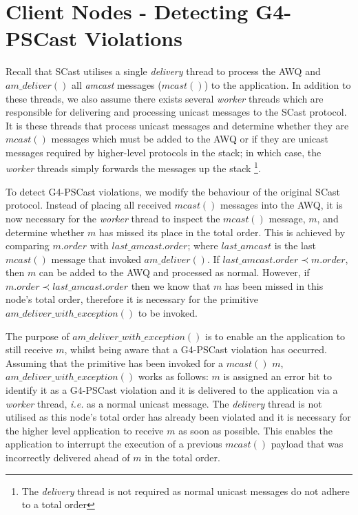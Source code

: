 \section{Client Nodes - Detecting G4-PSCast Violations}
Recall that \textsf{SCast} utilises a single \emph{delivery} thread to process the AWQ and $am\_deliver()$ all \emph{amcast} messages ($mcast()$) to the application.  In addition to these threads, we also assume there exists several \emph{worker} threads which are responsible for delivering and processing unicast messages to the \textsf{SCast} protocol.  It is these threads that process unicast messages and determine whether they are $mcast()$ messages which must be added to the AWQ or if they are unicast messages required by higher-level protocols in the stack; in which case, the \emph{worker} threads simply forwards the messages up the stack \footnote{The \emph{delivery} thread is not required as normal unicast messages do not adhere to a total order}.  

To detect G4-PSCast violations, we modify the behaviour of the original \textsf{SCast} protocol.  Instead of placing all received $mcast()$ messages into the AWQ, it is now necessary for the \emph{worker} thread to inspect the $mcast()$ message, $m$, and determine whether $m$ has missed its place in the total order.  This is achieved by comparing $m.order$ with $last\_amcast.order$; where $last\_amcast$ is the last $mcast()$ message that invoked $am\_deliver()$.  If $last\_amcast.order \prec m.order$, then $m$ can be added to the AWQ and processed as normal.  However, if $m.order \prec last\_amcast.order$ then we know that $m$ has been missed in this node's total order, therefore it is necessary for the primitive $am\_deliver\_with\_exception()$ to be invoked.  

The purpose of $am\_deliver\_with\_exception()$ is to enable an the application to still receive $m$, whilst being aware that a G4-PSCast violation has occurred.  Assuming that the primitive has been invoked for a $mcast()$ $m$, $am\_deliver\_with\_exception()$ works as follows:  $m$ is assigned an error bit to identify it as a G4-PSCast violation and it is delivered to the application via a \emph{worker} thread, \emph{i.e.} as a normal unicast message.  The \emph{delivery} thread is not utilised as this node's total order has already been violated and it is necessary for the higher level application to receive $m$ as soon as possible.  This enables the application to interrupt the execution of a previous $mcast()$ payload that was incorrectly delivered ahead of $m$ in the total order.  

